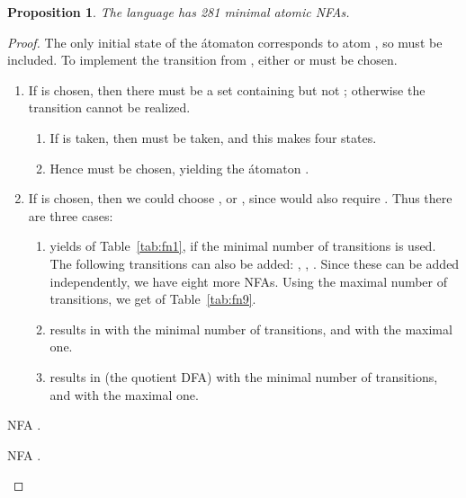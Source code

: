 \documentclass[preprint,12pt]{elsarticle}
\newcommand{\be}{\begin{enumerate}}
\newcommand{\ee}{\end{enumerate}}
\newtheorem{proposition}{Proposition}
\begin{document}
\begin{proposition} 
\label{prop:281}
The language  has 281 minimal atomic NFAs. 
\end{proposition}
\begin{proof}

The only initial state of the \'atomaton  corresponds to atom , 
so  must be included.
To implement the transition
 from ,
either  or  must be chosen. 
\be
\item
If  is chosen, then there must be a set containing  but not ; otherwise 
the transition 
  cannot be realized.
        \be
        \item
        If  is taken, then  must be taken, and this makes four states.
        \item
         Hence  must be chosen, yielding the \'atomaton .
         \ee
\item
If  is chosen, then we could choose ,  or , 
since  would also require . Thus there are three cases:
        \be
        \item
         yields  of Table~\ref{tab:fn1}, if the minimal number of 
        transitions is used. 
        The following transitions can also be added: 
        , , .
        Since these can be added independently, we have eight more NFAs. 
        Using the maximal number of transitions, we get  of Table~\ref{tab:fn9}.
        \item
         results in  with the minimal number 
          of transitions, and  with the maximal one.
        \item
         results in  (the quotient DFA) 
          with the minimal number of transitions, and   with the maximal one.
        \ee
\ee

\begin{table}[h]
\begin{minipage}[b]{0.45\linewidth}
\caption{NFA .}
\label{tab:fn1}
{\footnotesize
\begin{center}

\end{center}}
\end{minipage}
\hspace{0.1cm}
\begin{minipage}[b]{0.45\linewidth}
\caption{NFA .}
\label{tab:fn9}
{\footnotesize
\begin{center}

\end{center}}
\end{minipage}
\end{table}



\end{proof}
\end{document}
